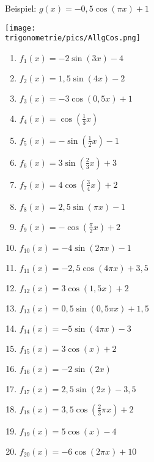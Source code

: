 \vspace{2cm}

Beispiel: \(\displaystyle g(x)=-0,5\cos\left(\pi x\right)+1\)

\medskip

\begin{minipage}{\textwidth}
	\texttt{[image: \\trigonometrie/pics/AllgCos.png]}
\end{minipage}
\newpage

\begin{Exercise}[title={\raggedright\normalfont Gib jeweils die Amplitude, die Periode und den Mittelwert an. Skizziere dann das Schaubild so, dass mindestens eine Periode zu sehen ist.}, label=allgSinCosA1]

	\begin{enumerate}[label=\alph*)]
		\item \(f_1(x)=-2\sin\left(3x\right)-4\)
		\item \(f_2(x)=1,5\sin\left(4x\right)-2\)
		\item \(f_3(x)=-3\cos\left(0,5x\right)+1\)
		\item \(f_4(x)=\cos\left(\frac{1}{3}x\right)\)
		\item \(f_5(x)=-\sin\left(\frac{1}{2}x\right)-1\)
		\item \(f_6(x)=3\sin\left(\frac{2}{3}x\right)+3\)
		\item \(f_7(x)=4\cos\left(\frac{3}{4}x\right)+2\)
		\item \(f_8(x)=2,5\sin\left(\pi x\right)-1\)
		\item \(f_9(x)=-\cos\left(\frac{\pi}{2}x\right)+2\)
		\item \(f_{10}(x)=-4\sin\left(2\pi x\right)-1\)
		\item \(f_{11}(x)=-2,5\cos\left(4\pi x\right)+3,5\)
		\item \(f_{12}(x)=3\cos\left(1,5x\right)+2\)
		\item \(f_{13}(x)=0,5\sin\left(0,5\pi x\right)+1,5\)
		\item \(f_{14}(x)=-5\sin\left(4\pi x\right)-3\)
		\item \(f_{15}(x)=3\cos\left(x\right)+2\)
		\item \(f_{16}(x)=-2\sin\left(2x\right)\)
		\item \(f_{17}(x)=2,5\sin\left(2x\right)-3,5\)
		\item \(f_{18}(x)=3,5\cos\left(\frac{2}{3}\pi x\right)+2\)
		\item \(f_{19}(x)=5\cos\left(x\right)-4\)
		\item \(f_{20}(x)=-6\cos\left(2\pi x\right)+10\)
	\end{enumerate}
\end{Exercise}

